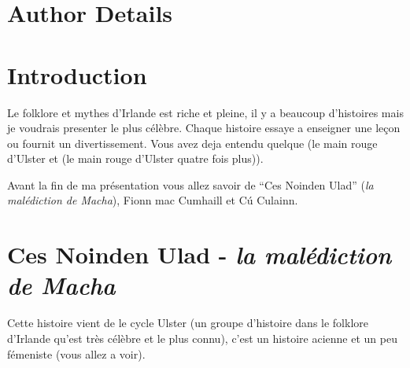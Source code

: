 \documentclass[colorlinks,12pt,a4paper,normalphoto,withhyper,ragged2e]{altareport}
\begin{document}
\MakeReportTitlePage


\setcounter{page}{1}






\section*{Author Details}
\makeauthordetails




\setcounter{tocdepth}{2} 
\tableofcontents %

\newpage
{} %



\section{Introduction}
Le folklore et mythes d'Irlande est riche et pleine, il y a beaucoup d'histoires mais je voudrais presenter le plus célèbre. Chaque histoire essaye a enseigner une leçon ou fournit un divertissement. Vous avez deja entendu quelque (le main rouge d'Ulster et (le main rouge d'Ulster quatre fois plus)). \linebreak

Avant la fin de ma présentation vous allez savoir de ``Ces Noinden Ulad'' (\textit{la malédiction de Macha}), Fionn mac Cumhaill et Cú Culainn. \linebreak




\section{Ces Noinden Ulad - \textit{la malédiction de Macha}}
Cette histoire vient de le cycle Ulster (un groupe d'histoire dans le folklore d'Irlande qu'est très célèbre et le plus connu), c'est un histoire acienne et un peu fémeniste (vous allez a voir). \linebreak
\end{document}
